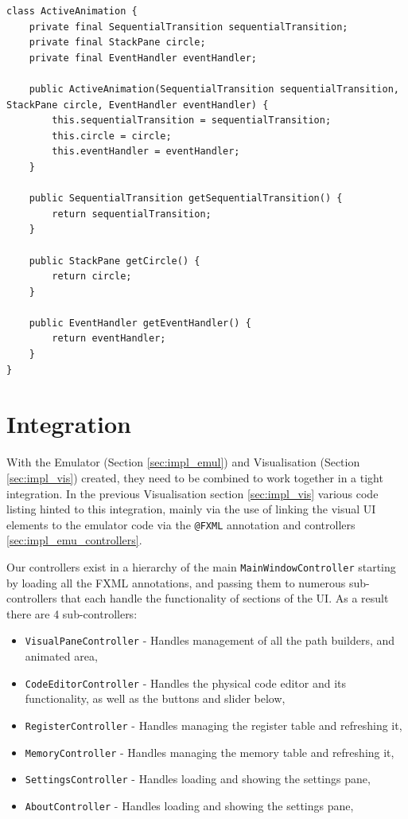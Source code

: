 \begin{lstlisting}[caption=ActiveAnimation wrapper, label=lst:active_anim]
class ActiveAnimation {
    private final SequentialTransition sequentialTransition;
    private final StackPane circle;
    private final EventHandler eventHandler;
    
    public ActiveAnimation(SequentialTransition sequentialTransition, StackPane circle, EventHandler eventHandler) {
        this.sequentialTransition = sequentialTransition;
        this.circle = circle;
        this.eventHandler = eventHandler;
    }
    
    public SequentialTransition getSequentialTransition() {
        return sequentialTransition;
    }
    
    public StackPane getCircle() {
        return circle;
    }
    
    public EventHandler getEventHandler() {
        return eventHandler;
    }
}
\end{lstlisting}


\section{Integration}\label{sec:impl_integ}
With the Emulator (Section \ref{sec:impl_emul}) and Visualisation (Section \ref{sec:impl_vis}) created, they need to be combined to work together in a tight integration. In the previous Visualisation section \ref{sec:impl_vis} various code listing hinted to this integration, mainly via the use of linking the visual \ac{UI} elements to the emulator code via the \texttt{@FXML} annotation and controllers \ref{sec:impl_emu_controllers}.

Our controllers exist in a hierarchy of the main \texttt{MainWindowController} starting by loading all the FXML annotations, and passing them to numerous sub-controllers that each handle the functionality of sections of the \ac{UI}. As a result there are 4 sub-controllers:
\begin{itemize}
    \item \texttt{VisualPaneController} - Handles management of all the path builders, and animated area,
    \item \texttt{CodeEditorController} - Handles the physical code editor and its functionality, as well as the buttons and slider below,
    \item \texttt{RegisterController} - Handles managing the register table and refreshing it,
    \item \texttt{MemoryController} - Handles managing the memory table and refreshing it,
    \item \texttt{SettingsController} - Handles loading and showing the settings pane,
    \item \texttt{AboutController} - Handles loading and showing the settings pane,
\end{itemize}

